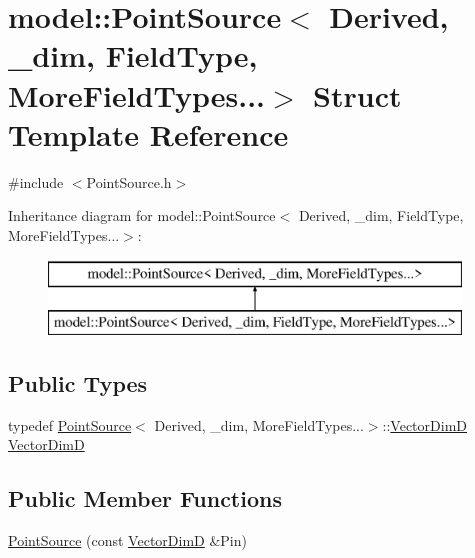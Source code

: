 \hypertarget{structmodel_1_1_point_source_3_01_derived_00_01__dim_00_01_field_type_00_01_more_field_types_8_8_8_4}{}\section{model\+:\+:Point\+Source$<$ Derived, \+\_\+dim, Field\+Type, More\+Field\+Types...$>$ Struct Template Reference}
\label{structmodel_1_1_point_source_3_01_derived_00_01__dim_00_01_field_type_00_01_more_field_types_8_8_8_4}


{\ttfamily \#include $<$Point\+Source.\+h$>$}

Inheritance diagram for model\+:\+:Point\+Source$<$ Derived, \+\_\+dim, Field\+Type, More\+Field\+Types...$>$\+:\begin{figure}[H]
\begin{center}
\leavevmode
\includegraphics[height=2.000000cm]{structmodel_1_1_point_source_3_01_derived_00_01__dim_00_01_field_type_00_01_more_field_types_8_8_8_4}
\end{center}
\end{figure}
\subsection*{Public Types}
\begin{DoxyCompactItemize}
\item 
typedef \hyperlink{structmodel_1_1_point_source}{Point\+Source}$<$ Derived, \+\_\+dim, More\+Field\+Types...$>$\+::\hyperlink{structmodel_1_1_point_source_3_01_derived_00_01__dim_00_01_field_type_00_01_more_field_types_8_8_8_4_a310517b29a0ce279fd5d968c40564f20}{Vector\+Dim\+D} \hyperlink{structmodel_1_1_point_source_3_01_derived_00_01__dim_00_01_field_type_00_01_more_field_types_8_8_8_4_a310517b29a0ce279fd5d968c40564f20}{Vector\+Dim\+D}
\end{DoxyCompactItemize}
\subsection*{Public Member Functions}
\begin{DoxyCompactItemize}
\item 
\hyperlink{structmodel_1_1_point_source_3_01_derived_00_01__dim_00_01_field_type_00_01_more_field_types_8_8_8_4_ac9c2e293d8186accb28a63965c8adf20}{Point\+Source} (const \hyperlink{structmodel_1_1_point_source_3_01_derived_00_01__dim_00_01_field_type_00_01_more_field_types_8_8_8_4_a310517b29a0ce279fd5d968c40564f20}{Vector\+Dim\+D} \&Pin)
\end{DoxyCompactItemize}


